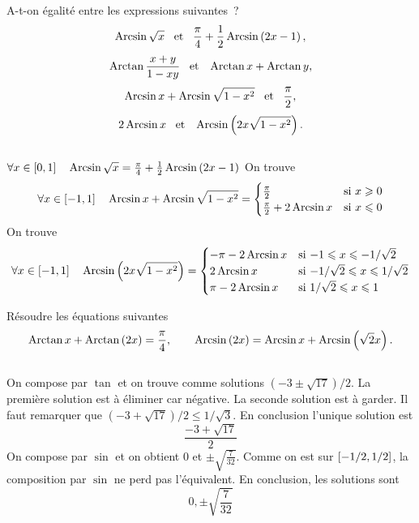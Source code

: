 \documentclass{magnolia}
\begin{document}

A-t-on égalité entre les expressions suivantes~?
$$\operatorname{Arcsin}\sqrt{x} \quad\!\text{et}\quad\! \frac{\pi}{4}+\frac{1}{2}\operatorname{Arcsin}\left(2x-1\right),$$
$$\operatorname{Arctan}\frac{x+y}{1-xy} \quad\!\text{et}\quad\! \operatorname{Arctan} x+\operatorname{Arctan} y,$$
$$\operatorname{Arcsin} x+\operatorname{Arcsin}\sqrt{1-x^2} \quad\!\text{et}\quad\! \frac{\pi}{2},$$
$$2\operatorname{Arcsin} x \quad\!\text{et}\quad\! \operatorname{Arcsin}\left(2x\sqrt{1-x^2}\right).$$
\begin{sol}
$\quad$
\begin{questions}
\question $\forall x\in\left[0,1\right] \quad
  \operatorname{Arcsin}\sqrt{x}=\frac{\pi}{4}+\frac{1}{2}\operatorname{Arcsin}\left(2x-1\right)$
\question
\question On trouve
  \[\forall x\in\left[-1,1\right] \quad \operatorname{Arcsin} x+\operatorname{Arcsin}\sqrt{1-x^2}=
    \begin{cases}
    \frac{\pi}{2} & \text{si $x\geqslant 0$}\\
    \frac{\pi}{2}+2\operatorname{Arcsin} x & \text{si $x\leqslant 0$}
    \end{cases}\]
\question On trouve
  \[\forall x\in\left[-1,1\right] \quad \operatorname{Arcsin}\left(2x\sqrt{1-x^2}\right)=
    \begin{cases}
    -\pi-2\operatorname{Arcsin} x & \text{si $-1\leqslant x \leqslant -1/\sqrt{2}$}\\
    2\operatorname{Arcsin} x & \text{si $-1/\sqrt{2}\leqslant x\leqslant 1/\sqrt{2}$}\\
    \pi-2\operatorname{Arcsin} x & \text{si $1/\sqrt{2}\leqslant x \leqslant 1$}
    \end{cases}\]
\end{questions}
\end{sol}

Résoudre les équations suivantes
$$\operatorname{Arctan} x+\operatorname{Arctan}\left(2x\right)=\frac{\pi}{4}, \qquad
  \operatorname{Arcsin}\left(2x\right)=\operatorname{Arcsin}{x}+\operatorname{Arcsin}\left(\sqrt{2}x\right).$$
\begin{sol}
$\quad$
\begin{questions}
\question On compose par $\tan$ et on trouve comme solutions $(-3\pm\sqrt{17})/2$.
  La première solution est à éliminer car négative. La seconde solution
  est à garder. Il faut remarquer que $(-3+\sqrt{17})/2\leq1/\sqrt{3}$.
  En conclusion l'unique solution est
  \[\frac{-3+\sqrt{17}}{2}\]
\question On compose par $\sin$ et on obtient 0 et $\pm \sqrt{\frac{7}{32}}$.
  Comme on est sur $\left[-1/2,1/2\right]$, la composition par $\sin$ ne perd pas
  l'équivalent. En conclusion, les solutions sont
  \[0,\pm\sqrt{\frac{7}{32}}\]
\end{questions}
\end{sol}
\end{document}
